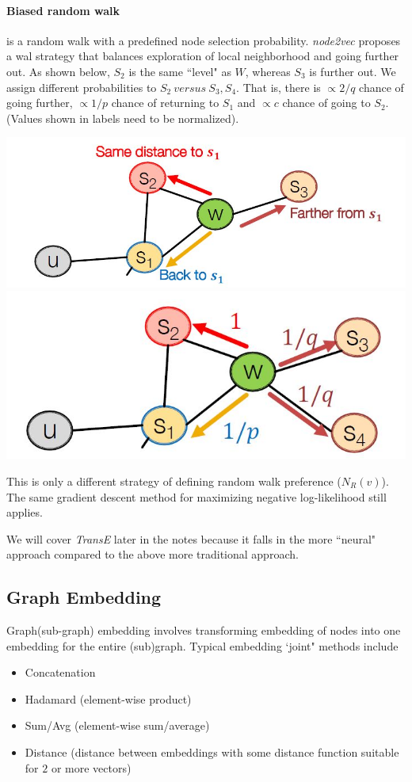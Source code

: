 \paragraph{Biased random walk} is a random walk with a predefined node selection probability. \textit{node2vec} proposes a wal strategy that balances exploration of local neighborhood and going further out. As shown below, $S_2$ is the same ``level" as $W$, whereas $S_3$ is further out. We assign different probabilities to $S_2\ versus\ S_3, S_4$. That is, there is $\propto 2/q$ chance of going further, $\propto 1/p$ chance of returning to $S_1$ and $\propto c$ chance of going to $S_2$. (Values shown in labels need to be normalized).

{
\centering
\includegraphics[width=0.45\linewidth]{notes/img/l7_p41_bias1.JPG}
\hspace{1cm}
\includegraphics[width=0.45\linewidth]{notes/img/l7_p41_bias2.JPG} \par
}

This is only a different strategy of defining random walk preference ($N_R(v)$). The same gradient descent method for maximizing negative log-likelihood still applies.

We will cover \textit{TransE} later in the notes because it falls in the more ``neural" approach compared to the above more traditional approach.

\subsection{Graph Embedding} \label{ss_42_graph_emb}

Graph(sub-graph) embedding involves transforming embedding of nodes into one embedding for the entire (sub)graph. Typical embedding `joint" methods include 

\begin{itemize}
    \item Concatenation
    
    \item Hadamard (element-wise product)
    
    \item Sum/Avg (element-wise sum/average)
    
    \item Distance (distance between embeddings with some distance function suitable for $2$ or more vectors)
\end{itemize}{}

